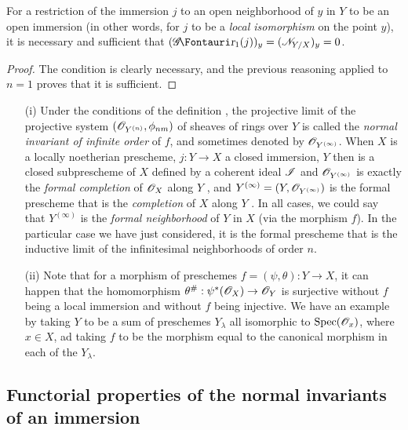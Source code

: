 \begin{corollary}[16.1.10]
\label{IV.16.1.10}
For a restriction of the immersion $j$ to an open neighborhood of $y$ in $Y$ to be an open immersion (in other words, for $j$ to be a \emph{local isomorphism} on the point $y$), it is necessary and sufficient that $(\shGr_1(j))_y = (\sh{N}_{Y/X})_y = 0$.
\end{corollary}

\begin{proof}
The condition is clearly necessary, and the previous reasoning applied to $n=1$ proves that it is sufficient.
\end{proof}

\begin{remark}[16.1.11]
\label{IV.16.1.11}
\medskip\noindent
\begin{enumerate}
  \item[(i)] Under the conditions of the definition , the projective limit of the projective system $(\mathscr{O}_{Y^{(n)}}, \phi_{nm})$ of sheaves of rings over $Y$ is called the \emph{normal invariant of infinite order} of $f$, and sometimes denoted by $\mathscr{O}_{Y^{(\infty)}}$.
  When $X$ is a locally noetherian prescheme, $j:Y \to X$ a closed immersion, $Y$ then is a closed subprescheme of $X$ defined by a coherent ideal $\mathscr{I}$ and $\mathscr{O}_{Y^{(\infty)}}$ is exactly the \emph{formal completion} of $\mathscr{O}_X$ along $Y$ , and $Y^{(\infty)} = (Y, \mathscr{O}_{Y^{(\infty)}})$ is the formal prescheme that is the \emph{completion} of $X$ along $Y$ .
  In all cases, we could say that $Y^{(\infty)}$ is the \emph{formal neighborhood} of $Y$ in $X$ (via the morphism $f$).
  In the particular case we have just considered, it is the formal prescheme that is the inductive limit of the infinitesimal neighborhoods of order $n$.
  \item[(ii)] Note that for a morphism of preschemes $f=(\psi, \theta): Y \to X$, it can happen that the homomorphism $\theta^\#:\psi^*(\sh{O}_X) \to \sh{O}_Y$ is surjective without $f$ being a local 
  immersion and without $f$ being injective.
  We have an example by taking $Y$ to be a sum of preschemes $Y_\lambda$ all isomorphic to $\operatorname{Spec}(\mathscr{O}_x)$, where $x \in X$, ad taking $f$ to be the morphism equal to the canonical morphism in each of the $Y_\lambda$.
\end{enumerate}
\end{remark}

\subsection{Functorial properties of the normal invariants of an immersion}
\label{IV.16.2}

